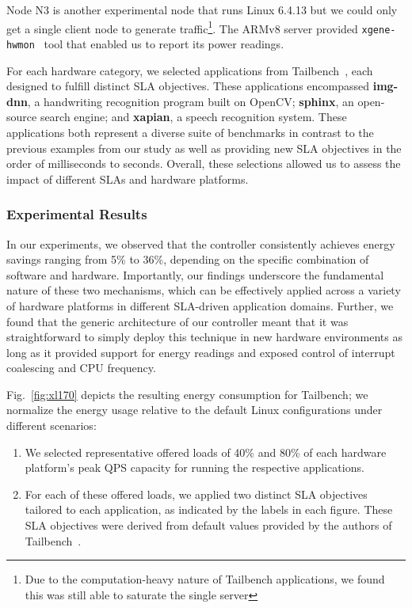 Node N3 is another experimental node that runs Linux 6.4.13 but we could only get a single client node to generate traffic\footnote{Due to the computation-heavy nature of Tailbench applications, we found this was still able to saturate the single server}. The ARMv8 server provided \texttt{xgene-hwmon}~\cite{armxgene} tool that enabled us to report its power readings. 

For each hardware category, we selected applications from Tailbench~\cite{tailbench}, each designed to fulfill distinct SLA objectives. These applications encompassed \textbf{img-dnn}, a handwriting recognition program built on OpenCV; \textbf{sphinx}, an open-source search engine; and \textbf{xapian}, a speech recognition system. These applications both represent a diverse suite of benchmarks in contrast to the previous examples from our study as well as providing new SLA objectives in the order of milliseconds to seconds. Overall, these selections allowed us to assess the impact of different SLAs and hardware platforms.


\subsubsection{Experimental Results}
In our experiments, we observed that the controller consistently achieves energy savings ranging from 5\% to 36\%, depending on the specific combination of software and hardware. Importantly, our findings underscore the fundamental nature of these two mechanisms, which can be effectively applied across a variety of hardware platforms in different SLA-driven application domains. Further, we found that the generic architecture of our controller meant that it was straightforward to simply deploy this technique in new hardware environments as long as it provided support for energy readings and exposed control of interrupt coalescing and CPU frequency. 

Fig.~\ref{fig:xl170} depicts the resulting energy consumption for Tailbench; we normalize the energy usage relative to the default Linux configurations under different scenarios:
\begin{enumerate}
    \item We selected representative offered loads of 40\% and 80\% of each hardware platform's peak QPS capacity for running the respective applications.
    \item For each of these offered loads, we applied two distinct SLA objectives tailored to each application, as indicated by the labels in each figure. These SLA objectives were derived from default values provided by the authors of Tailbench~\cite{tailbench}.
\end{enumerate}

